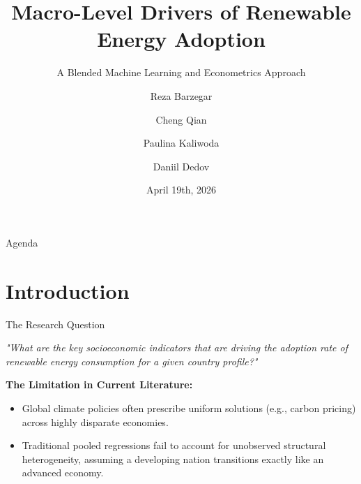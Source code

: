 \documentclass[aspectratio=169]{beamer}
\title[Drivers of Renewable Energy]{Macro-Level Drivers of Renewable Energy Adoption}
\subtitle{A Blended Machine Learning and Econometrics Approach}
\author[Barzegar, Qian, Kaliwoda, Dedov]{Reza Barzegar \and Cheng Qian \and Paulina Kaliwoda \and Daniil Dedov}
\institute[ISEG]{
  PDS - Programming for Data Science \\
  ISEG, Universidade de Lisboa
}
\date{April 19th, 2026}
\begin{document}
\begin{frame}
  \titlepage
\end{frame}

\begin{frame}{Agenda}
  \tableofcontents
\end{frame}

\section{Introduction}

\begin{frame}{The Research Question}
  \vspace{0.5cm}
  \begin{center}
      \Large \textit{"What are the key socioeconomic indicators that are driving the adoption rate of renewable energy consumption for a given country profile?"}
  \end{center}
  \vspace{0.8cm}
  
  \textbf{The Limitation in Current Literature:}
  \begin{itemize}
      \item Global climate policies often prescribe uniform solutions (e.g., carbon pricing) across highly disparate economies.
      \item Traditional pooled regressions fail to account for unobserved structural heterogeneity, assuming a developing nation transitions exactly like an advanced economy.
  \end{itemize}
\end{frame}
\end{document}
